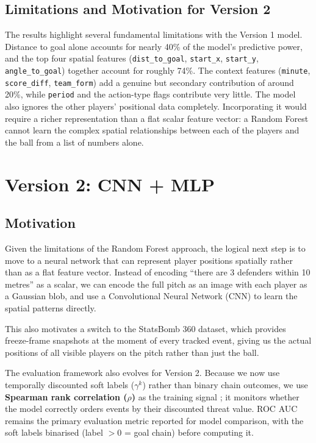 \documentclass{article}
\begin{document}
\subsection{Limitations and Motivation for Version 2}

The results highlight several fundamental limitations with the Version 1 model. Distance to goal alone accounts for nearly 40\% of the model's predictive power, and the top four spatial features (\texttt{dist\_to\_goal}, \texttt{start\_x}, \texttt{start\_y}, \texttt{angle\_to\_goal}) together account for roughly 74\%. The context features (\texttt{minute}, \texttt{score\_diff}, \texttt{team\_form}) add a genuine but secondary contribution of around 20\%, while \texttt{period} and the action-type flags contribute very little. The model also ignores the other players' positional data completely. Incorporating it would require a richer representation than a flat scalar feature vector: a Random Forest cannot learn the complex spatial relationships between each of the players and the ball from a list of numbers alone.

\section{Version 2: CNN + MLP}\label{sec:v2}

\subsection{Motivation}

Given the limitations of the Random Forest approach, the logical next step is to move to a neural network that can represent player positions spatially rather than as a flat feature vector. Instead of encoding ``there are 3 defenders within 10 metres'' as a scalar, we can encode the full pitch as an image with each player as a Gaussian blob, and use a Convolutional Neural Network (CNN) to learn the spatial patterns directly.

This also motivates a switch to the StatsBomb 360 dataset, which provides freeze-frame snapshots at the moment of every tracked event, giving us the actual positions of all visible players on the pitch rather than just the ball.

The evaluation framework also evolves for Version 2. Because we now use temporally discounted soft labels ($\gamma^k$) rather than binary chain outcomes, we use \textbf{Spearman rank correlation ($\rho$)} as the training signal ; it monitors whether the model correctly orders events by their discounted threat value. ROC AUC remains the primary evaluation metric reported for model comparison, with the soft labels binarised (label $> 0$ = goal chain) before computing it.
\end{document}
